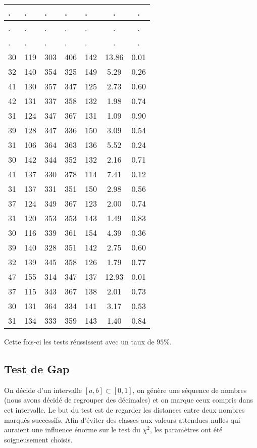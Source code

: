 \documentclass[12pt,a4paper]{article}
\begin{document}
\begin{center}
\begin{tabular}{|l|l|l|l|l|c|c|}
 . & . & . & . & . & . & . \\ \hline
 . & . & . & . & . & . & . \\ \hline
 . & . & . & . & . & . & . \\ \hline
30 & 119 & 303 & 406 & 142 & 13.86 &  0.01\\ \hline
32 & 140 & 354 & 325 & 149 &  5.29 &  0.26\\ \hline
41 & 130 & 357 & 347 & 125 &  2.73 &  0.60\\ \hline
42 & 131 & 337 & 358 & 132 &  1.98 &  0.74\\ \hline
31 & 124 & 347 & 367 & 131 &  1.09 &  0.90\\ \hline
39 & 128 & 347 & 336 & 150 &  3.09 &  0.54\\ \hline
31 & 106 & 364 & 363 & 136 &  5.52 &  0.24\\ \hline
30 & 142 & 344 & 352 & 132 &  2.16 &  0.71\\ \hline
41 & 137 & 330 & 378 & 114 &  7.41 &  0.12\\ \hline
31 & 137 & 331 & 351 & 150 &  2.98 &  0.56\\ \hline
37 & 124 & 349 & 367 & 123 &  2.00 &  0.74\\ \hline
31 & 120 & 353 & 353 & 143 &  1.49 &  0.83\\ \hline
30 & 116 & 339 & 361 & 154 &  4.39 &  0.36\\ \hline
39 & 140 & 328 & 351 & 142 &  2.75 &  0.60\\ \hline
32 & 139 & 345 & 358 & 126 &  1.79 &  0.77\\ \hline
47 & 155 & 314 & 347 & 137 & 12.93 &  0.01\\ \hline
37 & 115 & 343 & 367 & 138 &  2.01 &  0.73\\ \hline
30 & 131 & 364 & 334 & 141 &  3.17 &  0.53\\ \hline
31 & 134 & 333 & 359 & 143 &  1.40 &  0.84\\ \hline
\end{tabular}
\end{center}

Cette fois-ci les tests réussissent avec un taux de $95\%$.


\subsection{Test de Gap}
On décide d'un intervalle $[a,b] \subset [0,1]$,
on génère une séquence de nombres (nous avons décidé de regrouper des décimales)
et on marque ceux compris dans cet intervalle. Le but du test est de regarder les
distances entre deux nombres marqués successifs.
Afin d'éviter des classes aux valeurs attendues nulles
qui auraient une influence énorme sur le test du $\chi^2$,
les paramètres ont été soigneusement choisis.
\end{document}

